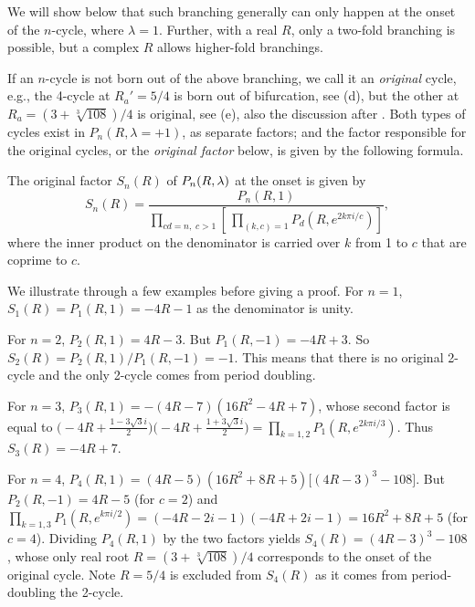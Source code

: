 \documentclass{ws-ijbc}
\begin{document}
We will show below that such branching generally can only happen
  at the onset of the $n$-cycle, where $\lambda = 1$.
%
Further, with a real $R$, only a two-fold branching is possible,
  but a complex $R$ allows higher-fold branchings.



If an $n$-cycle is not born out of the above branching,
  we call it an \emph{original} cycle,
  e.g., the 4-cycle at $R_a' = 5/4$
  is born out of bifurcation, see (d),
  but the other at $R_a = (3+\sqrt[3]{108})/4$
  is original, see (e),
  also the discussion after .
%
Both types of cycles exist in $P_n(R, \lambda = +1)$,
  as separate factors;
and the factor responsible for the original cycles,
  or the \emph{original factor} below,
  is given by the following formula.


\begin{theorem}
  The original factor $S_n(R)$ of $P_n(R, \lambda)$ at the onset is given by
  \begin{equation}
    S_n(R)
    = \frac
    {
      P_n(R, 1)
    }
    {
      \prod_{c d =  n, \; c > 1}
      \left[ \,
        \prod_{(k, c) = 1}
      P_{d}
        \left(
          R, e^{2k\pi i/c}
        \right)
      \right]
    },
  \label{eq:origfac}
  \end{equation}
  where the inner product on the denominator is carried over
   $k$ from 1 to $c$ that are coprime to $c$.
  \label{thm:origfac}
\end{theorem}

We illustrate  through a few examples
  before giving a proof.
%
For $n = 1$,
$S_1(R) = P_1(R, 1) = -4R - 1$
as the denominator is unity.


For $n = 2$,
$P_2(R, 1) = 4R - 3$.
But $P_1(R, -1) = -4R + 3$.
So $S_2(R) = P_2(R, 1)/P_1(R, -1) = -1$.
This means that there is no original 2-cycle
  and the only 2-cycle comes from period doubling.


For $n = 3$,
$P_3(R, 1) = -(4R - 7)(16 R^2 - 4 R + 7)$,
whose second factor is equal to
$
\big(-4R + \frac{1 - 3 \sqrt3 i}{2}\big)
\big(-4R + \frac{1 + 3 \sqrt3 i}{2}\big)
= \prod_{k=1,2} P_1(R, e^{2 k \pi i/3})$.
%
Thus $S_3(R) = -4R + 7$.



For $n = 4$,
$P_4(R, 1)
= (4R - 5) (16 R^2 + 8 R + 5)
  \bigl[
    (4R - 3)^3 - 108
  \bigr]$.
But
$P_2(R, -1) = 4R - 5$ (for $c = 2$)
and
$\prod_{k=1,3} P_1(R, e^{k\pi i/2})
=(-4R-2i-1)(-4R+2i-1)
=16R^2+8R+5$
(for $c = 4$).
Dividing $P_4(R, 1)$ by the two factors yields
$S_4(R) = (4R-3)^3 - 108$,
  whose only real root $R=(3+\sqrt[3]{108})/4$ corresponds to
  the onset of the original cycle.
Note $R = 5/4$ is excluded from $S_4(R)$
  as it comes from period-doubling the 2-cycle.
\end{document}
